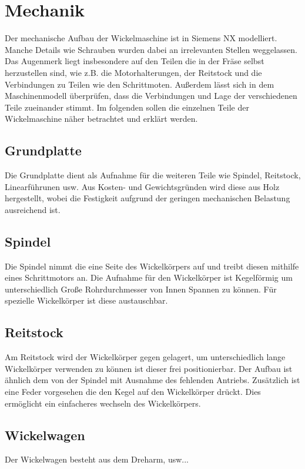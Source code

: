 \documentclass[12pt, a4paper, ngerman]{article}
\begin{document}
\section{Mechanik}
Der mechanische Aufbau der Wickelmaschine ist in Siemens NX modelliert. Manche Details wie Schrauben wurden dabei an irrelevanten Stellen weggelassen. Das Augenmerk liegt insbesondere auf den Teilen die in der Fräse selbst herzustellen sind, wie z.B. die Motorhalterungen, der Reitstock und die Verbindungen zu Teilen wie den Schrittmoten. Außerdem lässt sich in dem Maschinenmodell überprüfen, dass die Verbindungen und Lage der verschiedenen Teile zueinander stimmt. Im folgenden sollen die einzelnen Teile der Wickelmaschine näher betrachtet und erklärt werden.

\subsection{Grundplatte}
Die Grundplatte dient als Aufnahme für die weiteren Teile wie Spindel, Reitstock, Linearführunen usw. Aus Kosten- und Gewichtsgründen wird diese aus Holz hergestellt, wobei die Festigkeit aufgrund der geringen mechanischen Belastung ausreichend ist.

\subsection{Spindel}
Die Spindel nimmt die eine Seite des Wickelkörpers auf und treibt diesen mithilfe eines Schrittmotors an. Die Aufnahme für den Wickelkörper ist Kegelförmig um unterschiedlich Große Rohrdurchmesser von Innen Spannen zu können. Für spezielle Wickelkörper ist diese austauschbar.


\subsection{Reitstock}
Am Reitstock wird der Wickelkörper gegen gelagert, um unterschiedlich lange Wickelkörper verwenden zu können ist dieser frei positionierbar. Der Aufbau ist ähnlich dem von der Spindel mit Ausnahme des fehlenden Antriebs. Zusätzlich ist eine Feder vorgesehen die den Kegel auf den Wickelkörper drückt. Dies ermöglicht ein einfacheres wechseln des Wickelkörpers.  


\subsection{Wickelwagen}
Der Wickelwagen besteht aus dem Dreharm, usw...
\end{document}
